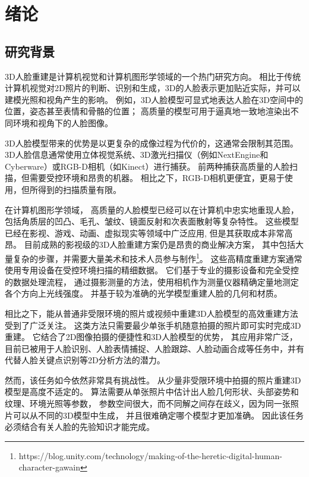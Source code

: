 \chapter{绪论}
\label{chap:intro}

\section{研究背景}

3D人脸重建是计算机视觉和计算机图形学领域的一个热门研究方向。
相比于传统计算机视觉对2D照片的判断、识别和生成，3D的人脸表示更加贴近实际，并可以建模光照和视角产生的影响。
例如，3D人脸模型可显式地表达人脸在3D空间中的位置，姿态甚至表情和骨骼的位置；
高质量的模型可用于逼真地一致地渲染出不同环境和视角下的人脸图像。

3D人脸模型带来的优势是以更复杂的成像过程为代价的，这通常会限制其范围。
3D人脸信息通常使用立体视觉系统\citep{DEP,ss_geo}、3D激光扫描仪（例如NextEngine和Cyberware）或RGB-D相机\citep{li2023}（如Kinect）进行捕获。
前两种捕获高质量的人脸扫描，但需要受控环境和昂贵的机器。
相比之下，RGB-D相机更便宜，更易于使用，但所得到的扫描质量有限。

在计算机图形学领域，
高质量的人脸模型已经可以在计算机中忠实地重现人脸，
包括角质层的凹凸、毛孔、皱纹、镜面反射和次表面散射等复杂特性。
这些模型已经在影视、游戏、动画、虚拟现实等领域中广泛应用,
但是其获取成本非常高昂。
目前成熟的影视级的3D人脸重建方案仍是昂贵的商业解决方案，
其中包括大量复杂的步骤，并需要大量美术和技术人员参与制作\footnote{https://blog.unity.com/technology/making-of-the-heretic-digital-human-character-gawain}。
这些高精度重建方案通常使用专用设备在受控环境扫描的精细数据。
它们基于专业的摄影设备和完全受控的数据处理流程，
通过摄影测量的方法，使用相机作为测量仪器精确定量地测定各个方向上光线强度。
并基于较为准确的光学模型重建人脸的几何和材质。

相比之下，能从普通非受限环境的照片或视频中重建3D人脸模型的高效重建方法受到了广泛关注。
这类方法只需要最少单张手机随意拍摄的照片即可实时完成3D重建。
它结合了2D图像拍摄的便捷性和3D人脸模型的优势，
其应用非常广泛，目前已被用于人脸识别\citep{BlanzV03,1022631413.nh,zhu2015high}、人脸表情捕捉\cite{Mo2022TowardsAF}、人脸跟踪\citep{Pham2016RobustRP}、人脸动画合成\citep{Cao20133DSR,thies2016face2face}等任务中，并有代替人脸关键点识别等2D分析方法的潜力。

然而，该任务如今依然非常具有挑战性。
从少量非受限环境中拍摄的照片重建3D模型是高度不适定的。
算法需要从单张照片中估计出人脸几何形状、头部姿势和纹理、环境光照等参数，
参数空间很大，而不同解之间存在歧义，因为同一张照片可以从不同的3D模型中生成，
并且很难确定哪个模型才更加准确。
因此该任务必须结合有关人脸的先验知识才能完成。

